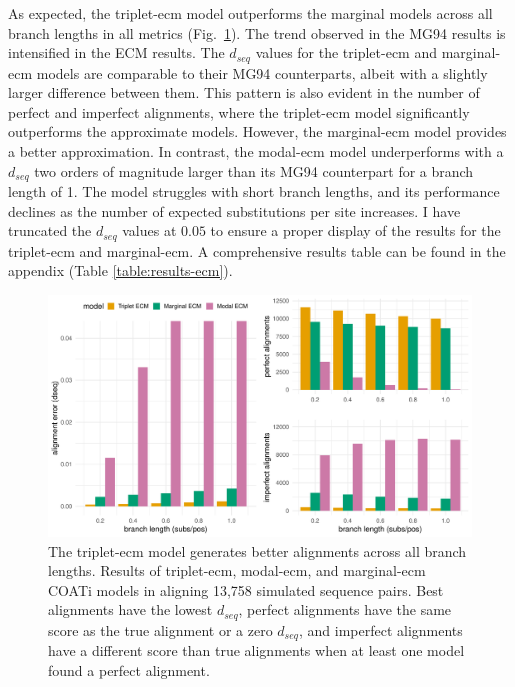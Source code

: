 As expected, the triplet-ecm model outperforms the marginal models across all branch lengths in all metrics (Fig.~\ref{fig:results_tri_mar_ecm}). The trend observed in the MG94 results is intensified in the ECM results. The $d_{seq}$ values for the triplet-ecm and marginal-ecm models are comparable to their MG94 counterparts, albeit with a slightly larger difference between them. This pattern is also evident in the number of perfect and imperfect alignments, where the triplet-ecm model significantly outperforms the approximate models. However, the marginal-ecm model provides a better approximation. In contrast, the modal-ecm model underperforms with a $d_{seq}$ two orders of magnitude larger than its MG94 counterpart for a branch length of 1. The model struggles with short branch lengths, and its performance declines as the number of expected substitutions per site increases. I have truncated the $d_{seq}$ values at $0.05$ to ensure a proper display of the results for the triplet-ecm and marginal-ecm. A comprehensive results table can be found in the appendix (Table \ref{table:results-ecm}).

\begin{figure}[!ht]
\centering
\includegraphics[width=\linewidth]{chapter3/figures/results/results_marginal_triplet_ecm.pdf}
 \vspace{1mm}
 \caption[Alignment Accuracy of the Triplet and Approximate ECM Models]{The triplet-ecm model generates better alignments across all branch lengths. Results of triplet-ecm, modal-ecm, and marginal-ecm COATi models in aligning 13,758 simulated sequence pairs. Best alignments have the lowest $d_{seq}$, perfect alignments have the same score as the true alignment or a zero $d_{seq}$, and imperfect alignments have a different score than true alignments when at least one model found a perfect alignment.}
 \label{fig:results_tri_mar_ecm}
\end{figure}

